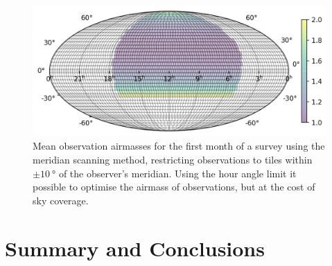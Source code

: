 \begin{colsection}
\begin{figure}[p]
    \begin{center}
        \includegraphics[width=0.7\linewidth]{images/survey_sims/30_1N4_meridian_airmass.png}
    \end{center}
    \caption[Mean observation airmasses using the meridian scanning method]{
        Mean observation airmasses for the first month of a survey using the meridian scanning method, restricting observations to tiles within $\pm\SI{10}{\degree}$ of the observer's meridian. Using the hour angle limit it possible to optimise the airmass of observations, but at the cost of sky coverage.
    }\label{fig:survey_sim_airmass_meridian}
\end{figure}

\end{colsection}


\section{Summary and Conclusions}
\label{sec:multiscope_conclusion}


